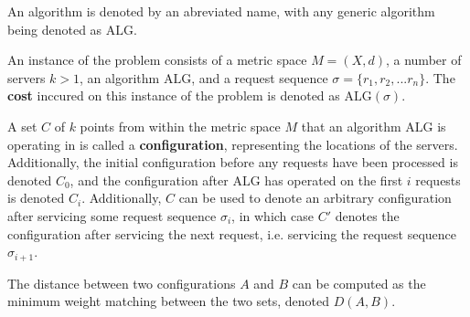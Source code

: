 \begin{definition}
    An algorithm is denoted by an abreviated name, with any generic algorithm being denoted as $\mathrm{ALG}$.
\end{definition}

\begin{definition}
    An instance of the \KS problem consists of a metric space $M = (X,d)$, a number of servers $k >1$, an algorithm $\mathrm{ALG}$, and a request sequence $\sigma = \{ r_1, r_2, ... r_n\}$. The \textbf{cost} inccured on this instance of the \KS problem is denoted as $\mathrm{ALG}(\sigma)$.
\end{definition}

\begin{definition}
    A set $C$ of $k$ points from within the metric space $M$ that an algorithm $\mathrm{ALG}$ is operating in is called a \textbf{configuration}, representing the locations of the servers. Additionally, the initial configuration before any requests have been processed is denoted $C_0$, and the configuration after $\mathrm{ALG}$ has operated on the first $i$ requests is denoted $C_{i}$. Additionally, $C$ can be used to denote an arbitrary configuration after servicing some request sequence $\sigma_i$, in which case $C'$ denotes the configuration after servicing the next request, i.e. servicing the request sequence $\sigma_{i+1}$.
\end{definition}

\begin{definition}
    The distance between two configurations $A$ and $B$ can be computed as the minimum weight matching between the two sets, denoted $D(A, B)$.
\end{definition}

